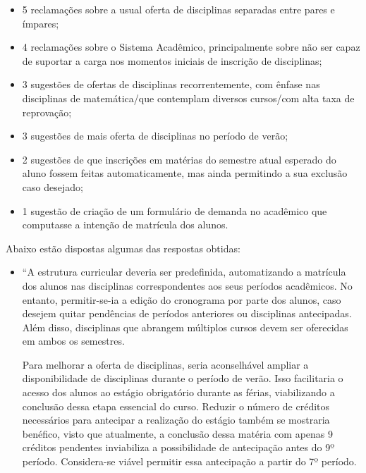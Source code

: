\begin{apendicesenv}
  \begin{itemize}
    \item 5 reclamações sobre a usual oferta de disciplinas separadas entre pares e ímpares;
    \item 4 reclamações sobre o Sistema Acadêmico, principalmente sobre não ser capaz de suportar a carga nos momentos iniciais de inscrição de disciplinas;
    \item 3 sugestões de ofertas de disciplinas recorrentemente, com ênfase nas disciplinas de matemática/que contemplam diversos cursos/com alta taxa de reprovação;
    \item 3 sugestões de mais oferta de disciplinas no período de verão;
    \item 2 sugestões de que inscrições em matérias do semestre atual esperado do aluno fossem feitas automaticamente, mas ainda permitindo a sua exclusão caso desejado;
    \item 1 sugestão de criação de um formulário de demanda no acadêmico que computasse a intenção de matrícula dos alunos.
  \end{itemize}

  Abaixo estão dispostas algumas das respostas obtidas:

  \begin{itemize}
    \item ``A estrutura curricular deveria ser predefinida, automatizando a matrícula dos alunos nas disciplinas correspondentes aos seus períodos acadêmicos. No entanto, permitir-se-ia a edição do cronograma por parte dos alunos, caso desejem quitar pendências de períodos anteriores ou disciplinas antecipadas. Além disso, disciplinas que abrangem múltiplos cursos devem ser oferecidas em ambos os semestres.

          Para melhorar a oferta de disciplinas, seria aconselhável ampliar a disponibilidade de disciplinas durante o período de verão. Isso facilitaria o acesso dos alunos ao estágio obrigatório durante as férias, viabilizando a conclusão dessa etapa essencial do curso. Reduzir o número de créditos necessários para antecipar a realização do estágio também se mostraria benéfico, visto que atualmente, a conclusão dessa matéria com apenas 9 créditos pendentes inviabiliza a possibilidade de antecipação antes do 9º período. Considera-se viável permitir essa antecipação a partir do 7º período.


\end{itemize}
\end{apendicesenv}
